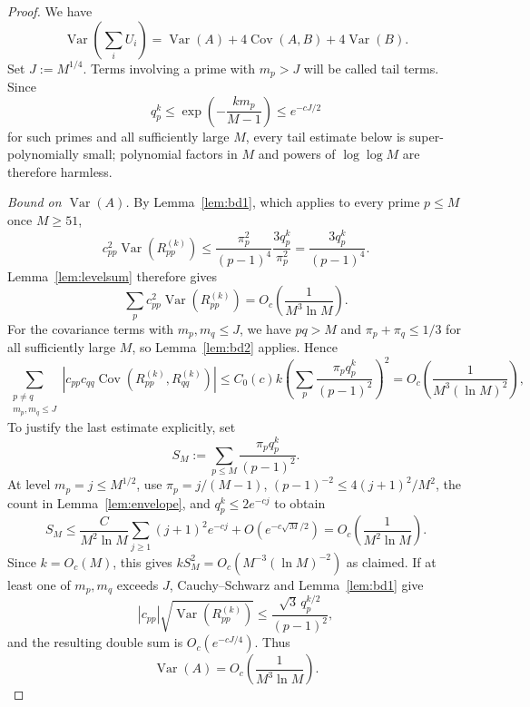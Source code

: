 \documentclass[11pt]{article}
\theoremstyle{remark}
\DeclareMathOperator{\Var}{Var}
\DeclareMathOperator{\Cov}{Cov}
\begin{document}
\begin{proof}
We have
\[
\Var\!\left(\sum_i U_i\right)=\Var(A)+4\Cov(A,B)+4\Var(B).
\]
Set $J:=M^{1/4}$. Terms involving a prime with $m_p>J$ will be called tail terms. Since
\[
q_p^k\leq \exp\!\left(-\frac{k m_p}{M-1}\right)\leq e^{-cJ/2}
\]
for such primes and all sufficiently large $M$, every tail estimate below is super-polynomially small; polynomial factors in $M$ and powers of $\log\log M$ are therefore harmless.

\textit{Bound on $\Var(A)$.}
By Lemma~\ref{lem:bd1}, which applies to every prime $p \leq M$ once $M \geq 51$,
\[
c_{pp}^2\Var(R_{pp}^{(k)})
\leq \frac{\pi_p^2}{(p-1)^4}\frac{3q_p^k}{\pi_p^2}
=\frac{3q_p^k}{(p-1)^4}.
\]
Lemma~\ref{lem:levelsum} therefore gives
\[
\sum_p c_{pp}^2\Var(R_{pp}^{(k)})
=O_c\!\left(\frac{1}{M^3\ln M}\right).
\]
For the covariance terms with $m_p,m_q\leq J$, we have $pq>M$ and $\pi_p+\pi_q\leq1/3$ for all sufficiently large $M$, so Lemma~\ref{lem:bd2} applies. Hence
\[
\sum_{\substack{p\ne q\\m_p,m_q\leq J}}
|c_{pp}c_{qq}\Cov(R_{pp}^{(k)},R_{qq}^{(k)})|
\leq C_0(c)k\left(\sum_p\frac{\pi_pq_p^k}{(p-1)^2}\right)^2
=O_c\!\left(\frac{1}{M^3(\ln M)^2}\right),
\]
To justify the last estimate explicitly, set
\[
S_M:=\sum_{p\leq M}\frac{\pi_pq_p^k}{(p-1)^2}.
\]
At level $m_p=j\leq M^{1/2}$, use $\pi_p=j/(M-1)$,
$(p-1)^{-2}\leq4(j+1)^2/M^2$, the count in Lemma~\ref{lem:envelope}, and $q_p^k\leq2e^{-cj}$ to obtain
\[
S_M\leq \frac{C}{M^2\ln M}
\sum_{j\geq1}(j+1)^2e^{-cj}
+O(e^{-c\sqrt M/2})
=O_c\!\left(\frac{1}{M^2\ln M}\right).
\]
Since $k=O_c(M)$, this gives $kS_M^2=O_c(M^{-3}(\ln M)^{-2})$ as claimed. If at least one of $m_p,m_q$ exceeds $J$, Cauchy--Schwarz and Lemma~\ref{lem:bd1} give
\[
|c_{pp}|\sqrt{\Var(R_{pp}^{(k)})}
\leq \frac{\sqrt{3}\,q_p^{k/2}}{(p-1)^2},
\]
and the resulting double sum is $O_c(e^{-cJ/4})$. Thus
\begin{equation}\label{eq:VarA-final}
\Var(A)=O_c\!\left(\frac{1}{M^3\ln M}\right).
\end{equation}


\end{proof}
\end{document}

